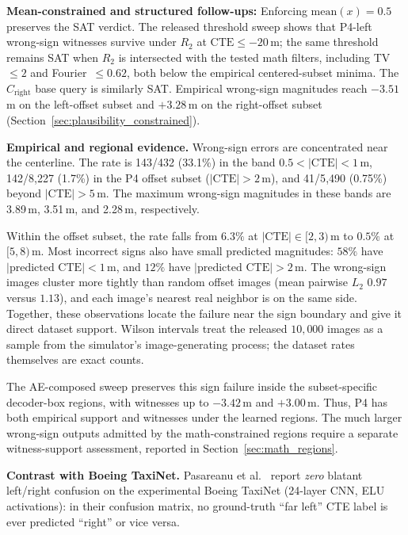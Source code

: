\documentclass[twocolumn,smallextended,runningheads]{svjour3}
\begin{document}
\textbf{Mean-constrained and structured follow-ups:} Enforcing $\text{mean}(x) = 0.5$ preserves the SAT verdict. The released threshold sweep shows that P4-left wrong-sign witnesses survive under $R_2$ at $\text{CTE} \le -20$\,m; the same threshold remains SAT when $R_2$ is intersected with the tested math filters, including TV~$\le 2$ and Fourier~$\le 0.62$, both below the empirical centered-subset minima. The $C_\text{right}$ base query is similarly SAT. Empirical wrong-sign magnitudes reach $-3.51$\,m on the left-offset subset and $+3.28$\,m on the right-offset subset (Section~\ref{sec:plausibility_constrained}).

\textbf{Empirical and regional evidence.} Wrong-sign errors are concentrated near the centerline. The rate is 143/432 (33.1\%) in the band $0.5<|\mathrm{CTE}|<1$\,m, 142/8{,}227 (1.7\%) in the P4 offset subset ($|\text{CTE}|>2$\,m), and 41/5{,}490 (0.75\%) beyond $|\mathrm{CTE}|>5$\,m. The maximum wrong-sign magnitudes in these bands are 3.89\,m, 3.51\,m, and 2.28\,m, respectively.

Within the offset subset, the rate falls from $6.3\%$ at $|\mathrm{CTE}|\in[2,3)$\,m to $0.5\%$ at $[5,8)$\,m. Most incorrect signs also have small predicted magnitudes: $58\%$ have $|\text{predicted CTE}|<1$\,m, and $12\%$ have $|\text{predicted CTE}|>2$\,m. The wrong-sign images cluster more tightly than random offset images (mean pairwise $L_2$ $0.97$ versus $1.13$), and each image's nearest real neighbor is on the same side. Together, these observations locate the failure near the sign boundary and give it direct dataset support. Wilson intervals treat the released $10{,}000$ images as a sample from the simulator's image-generating process; the dataset rates themselves are exact counts.

The AE-composed sweep preserves this sign failure inside the subset-specific decoder-box regions, with witnesses up to $-3.42$\,m and $+3.00$\,m. Thus, P4 has both empirical support and witnesses under the learned regions. The much larger wrong-sign outputs admitted by the math-constrained regions require a separate witness-support assessment, reported in Section~\ref{sec:math_regions}.

\textbf{Contrast with Boeing TaxiNet.} Pasareanu et al.~\cite{pasareanu2023closedloop} report \emph{zero} blatant left/right confusion on the experimental Boeing TaxiNet (24-layer CNN, ELU activations): in their confusion matrix, no ground-truth ``far left'' CTE label is ever predicted ``right'' or vice versa.
\end{document}
